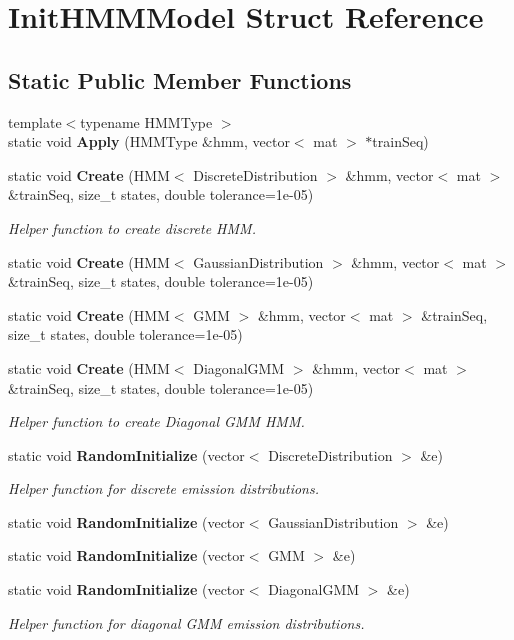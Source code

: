 \section{Init\+H\+M\+M\+Model Struct Reference}
\label{structInitHMMModel}
\subsection*{Static Public Member Functions}
\begin{DoxyCompactItemize}
\item 
{\footnotesize template$<$typename H\+M\+M\+Type $>$ }\\static void \textbf{ Apply} (H\+M\+M\+Type \&hmm, vector$<$ mat $>$ $\ast$train\+Seq)
\item 
static void \textbf{ Create} (H\+MM$<$ Discrete\+Distribution $>$ \&hmm, vector$<$ mat $>$ \&train\+Seq, size\+\_\+t states, double tolerance=1e-\/05)
\begin{DoxyCompactList}\small\item\em Helper function to create discrete H\+MM. \end{DoxyCompactList}\item 
static void \textbf{ Create} (H\+MM$<$ Gaussian\+Distribution $>$ \&hmm, vector$<$ mat $>$ \&train\+Seq, size\+\_\+t states, double tolerance=1e-\/05)
\item 
static void \textbf{ Create} (H\+MM$<$ G\+MM $>$ \&hmm, vector$<$ mat $>$ \&train\+Seq, size\+\_\+t states, double tolerance=1e-\/05)
\item 
static void \textbf{ Create} (H\+MM$<$ Diagonal\+G\+MM $>$ \&hmm, vector$<$ mat $>$ \&train\+Seq, size\+\_\+t states, double tolerance=1e-\/05)
\begin{DoxyCompactList}\small\item\em Helper function to create Diagonal G\+MM H\+MM. \end{DoxyCompactList}\item 
static void \textbf{ Random\+Initialize} (vector$<$ Discrete\+Distribution $>$ \&e)
\begin{DoxyCompactList}\small\item\em Helper function for discrete emission distributions. \end{DoxyCompactList}\item 
static void \textbf{ Random\+Initialize} (vector$<$ Gaussian\+Distribution $>$ \&e)
\item 
static void \textbf{ Random\+Initialize} (vector$<$ G\+MM $>$ \&e)
\item 
static void \textbf{ Random\+Initialize} (vector$<$ Diagonal\+G\+MM $>$ \&e)
\begin{DoxyCompactList}\small\item\em Helper function for diagonal G\+MM emission distributions. \end{DoxyCompactList}\end{DoxyCompactItemize}


